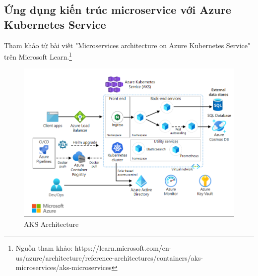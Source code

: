 \subsection{Ứng dụng kiến trúc microservice với Azure Kubernetes Service}
\noindent Tham khảo từ bài viết "Microservices architecture on Azure Kubernetes Service" trên Microsoft Learn.\footnote{Nguồn tham khảo: https://learn.microsoft.com/en-us/azure/architecture/reference-architectures/containers/aks-microservices/aks-microservices}
\begin{figure}[H]
    \begin{center}
    \includegraphics[scale=0.8]{images/hieu/chap-2/aks-architecture.png}
    \vspace*{5mm}
    \caption{AKS Architecture}
    \end{center}
\end{figure}
